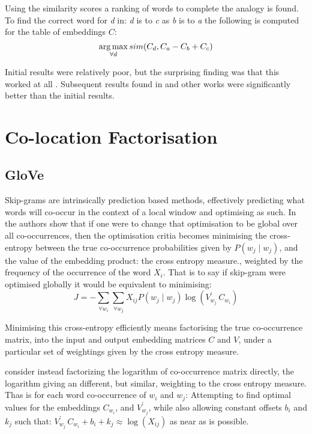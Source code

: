 \documentclass[parskip]{komatufte}
\begin{document}
Using the similarity scores a ranking of words to complete the analogy is found.
To find the correct word for \emph{d} in: \emph{d} is to \emph{c} as \emph{b} is to \emph{a}
the following is computed for the table of embeddings $C$:
\begin{equation}
\operatorname*{arg\,max}_{\forall d} sim(C_d, C_a-C_b+C_c)
\end{equation}


Initial results were relatively poor, but the surprising finding was that this worked at all \cite{mikolov2013linguisticsubstructures}.
Subsequent results found in  and other works were significantly better than the initial results.

\section{Co-location Factorisation}

\subsection{GloVe}

Skip-grams are intrinsically prediction based methods, effectively predicting what words will co-occur in the context of a local window and optimising as such.
In the authors show that if one were to change that optimisation to be global over all co-occurrences,
then the optimisation critia becomes minimising the cross-entropy between the true co-occurrence probabilities given by $P(w_j\mid w_j)$, and the value of the embedding product: the cross entropy measure.,
weighted by the frequency of the occurrence of the word $X_i$.
That is to say if skip-gram were optimised globally it would be equivalent to minimising:
\begin{equation}
J = - \sum_{\forall w_i} \sum_{\forall w_j} X_{ij} P(w_j\mid w_j) \log (V_{w_j}^\prime\,C_{w_{i}})
\end{equation}

Minimising this cross-entropy efficiently means factorising the true co-occurrence matrix,
into the input and output embedding matrices $C$ and $V$, under a particular set of weightings given by the cross entropy measure.

 consider instead factorizing the logarithm of co-occurrence matrix directly,
the logarithm giving an different, but similar, weighting to the cross entropy measure.
Thas is for each word co-occurrence of $w_i$ and $w_j$: Attempting to find optimal values for 
the embeddings $C_{w_{i}}$, and $V_{w_j}^\prime$, while also allowing constant offsets $b_i$ and $k_j$
such that:
$V_{w_j}^\prime\,C_{w_{i}} + b_i + k_j \approx \log(X_{ij})$
as near as is possible.
\end{document}
